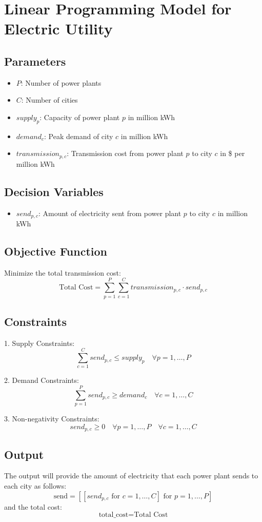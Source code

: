 \documentclass{article}
\begin{document}
\section*{Linear Programming Model for Electric Utility}

\subsection*{Parameters}
\begin{itemize}
    \item \( P \): Number of power plants
    \item \( C \): Number of cities
    \item \( supply_p \): Capacity of power plant \( p \) in million kWh
    \item \( demand_c \): Peak demand of city \( c \) in million kWh
    \item \( transmission_{p,c} \): Transmission cost from power plant \( p \) to city \( c \) in \$ per million kWh
\end{itemize}

\subsection*{Decision Variables}
\begin{itemize}
    \item \( send_{p,c} \): Amount of electricity sent from power plant \( p \) to city \( c \) in million kWh
\end{itemize}

\subsection*{Objective Function}
Minimize the total transmission cost:
\[
\text{Total Cost} = \sum_{p=1}^{P} \sum_{c=1}^{C} transmission_{p,c} \cdot send_{p,c}
\]

\subsection*{Constraints}
1. Supply Constraints:
\[
\sum_{c=1}^{C} send_{p,c} \leq supply_p \quad \forall p = 1, \ldots, P
\]

2. Demand Constraints:
\[
\sum_{p=1}^{P} send_{p,c} \geq demand_c \quad \forall c = 1, \ldots, C
\]

3. Non-negativity Constraints:
\[
send_{p,c} \geq 0 \quad \forall p = 1, \ldots, P \quad \forall c = 1, \ldots, C
\]

\subsection*{Output}
The output will provide the amount of electricity that each power plant sends to each city as follows:
\[
\text{send} = \left[ \left[ send_{p,c} \text{ for } c = 1, \ldots, C \right] \text{ for } p = 1, \ldots, P \right]
\]
and the total cost:
\[
\text{total\_cost} = \text{Total Cost}
\]
\end{document}
